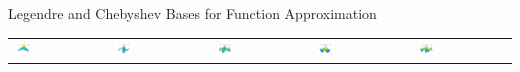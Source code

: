 \documentclass[11pt,compress,xcolor={usenames,dvipsnames},aspectratio=169]{beamer}
\begin{document}
\begin{frame}{Legendre and Chebyshev Bases for Function Approximation}
\begin{tabular}{>{\centering}m{}>{\centering}m{}>{\centering}m{}>{\centering}m{}>{\centering}m{}}
\includegraphics[width =0.18\textwidth]{ProgramsImages/Chebyshev_Degree_1_1.png}  &
\includegraphics[width =0.18\textwidth]{ProgramsImages/Chebyshev_Degree_1_2.png}  &
\includegraphics[width =0.18\textwidth]{ProgramsImages/Chebyshev_Degree_1_3.png}  &
\includegraphics[width =0.18\textwidth]{ProgramsImages/Chebyshev_Degree_2_2.png}  &
\includegraphics[width =0.18\textwidth]{ProgramsImages/Chebyshev_Degree_2_3.png} 
	\end{tabular}
\end{frame}




\thankyouframe

\printbibliography
\end{document}
